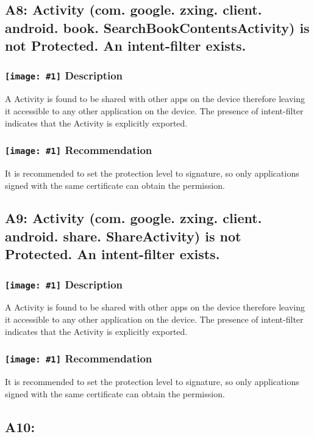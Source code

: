 \documentclass[12p]{article}
\newcommand{\icon}[1]{\texttt{[image: \#1]}}
\begin{document}
\subsection{A8: Activity (com. google. zxing. client. android. book. SearchBookContentsActivity) is not Protected. An intent-filter exists.}
\subsubsection*{\protect\icon{/home/miki/Documents/GITHUB/AndroidPermissions/python/vulns/report_icons/basic_sheet.png} Description}
A  Activity is found to be shared with other apps on the device therefore leaving it accessible to any other application on the device. The presence of intent-filter indicates that the Activity is explicitly exported.
\subsubsection*{\protect\icon{/home/miki/Documents/GITHUB/AndroidPermissions/python/vulns/report_icons/basic_todo.png} Recommendation}
It is recommended to set the protection level to signature, so only applications signed with the same certificate can obtain the permission.
\subsection{A9: Activity (com. google. zxing. client. android. share. ShareActivity) is not Protected. An intent-filter exists.}
\subsubsection*{\protect\icon{/home/miki/Documents/GITHUB/AndroidPermissions/python/vulns/report_icons/basic_sheet.png} Description}
A  Activity is found to be shared with other apps on the device therefore leaving it accessible to any other application on the device. The presence of intent-filter indicates that the Activity is explicitly exported.
\subsubsection*{\protect\icon{/home/miki/Documents/GITHUB/AndroidPermissions/python/vulns/report_icons/basic_todo.png} Recommendation}
It is recommended to set the protection level to signature, so only applications signed with the same certificate can obtain the permission.
\subsection{A10: }
\end{document}

